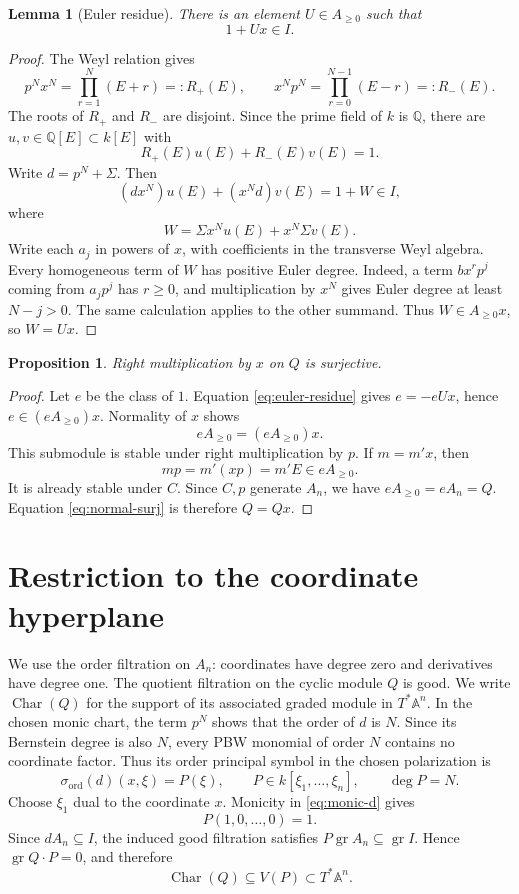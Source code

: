 \documentclass[11pt]{amsart}
\newtheorem{proposition}[theorem]{Proposition}
\newtheorem{lemma}[theorem]{Lemma}
\theoremstyle{definition}
\newcommand{\CharVar}{\operatorname{Char}}
\begin{document}
\begin{lemma}[Euler residue]\label{lem:euler-residue}
There is an element $U\in A_{\geq0}$ such that
\[
 1+Ux\in I.
 \tag{2.5}\label{eq:euler-residue}
\]
\end{lemma}

\begin{proof}
The Weyl relation gives
\[
 p^Nx^N=\prod_{r=1}^N(E+r)=:R_+(E),\qquad
 x^Np^N=\prod_{r=0}^{N-1}(E-r)=:R_-(E).
\]
The roots of $R_+$ and $R_-$ are disjoint. Since the prime field of $k$ is
$\mathbb Q$, there are $u,v\in\mathbb Q[E]\subset k[E]$ with
\[
 R_+(E)u(E)+R_-(E)v(E)=1.
\]
Write $d=p^N+\Sigma$. Then
\[
 (dx^N)u(E)+(x^Nd)v(E)=1+W\in I,
\]
where
\[
 W=\Sigma x^Nu(E)+x^N\Sigma v(E).
\]
Write each $a_j$ in powers of $x$, with coefficients in the transverse Weyl
algebra. Every homogeneous term of $W$ has positive Euler degree. Indeed, a term
$bx^rp^j$ coming from $a_jp^j$ has $r\geq0$, and multiplication by
$x^N$ gives Euler degree at least $N-j>0$. The same calculation applies to
the other summand. Thus $W\in A_{\geq0}x$, so $W=Ux$.
\end{proof}

\begin{proposition}\label{prop:x-surjective}
Right multiplication by $x$ on $Q$ is surjective.
\end{proposition}

\begin{proof}
Let $e$ be the class of $1$. Equation \eqref{eq:euler-residue} gives
$e=-eUx$, hence $e\in(eA_{\geq0})x$. Normality of $x$ shows
\[
 eA_{\geq0}=(eA_{\geq0})x.
 \tag{2.6}\label{eq:normal-surj}
\]
This submodule is stable under right multiplication by $p$. If $m=m'x$, then
\[
 mp=m'(xp)=m'E\in eA_{\geq0}.
\]
It is already stable under $C$. Since $C,p$ generate $A_n$, we have
$eA_{\geq0}=eA_n=Q$. Equation \eqref{eq:normal-surj} is therefore $Q=Qx$.
\end{proof}

\section{Restriction to the coordinate hyperplane}

We use the order filtration on $A_n$: coordinates have degree zero and
derivatives have degree one. The quotient filtration on the cyclic module
$Q$ is good. We write $\CharVar(Q)$ for the support of its associated graded
module in $T^*\mathbb A^n$. In the chosen monic chart, the term $p^N$ shows
that the order of $d$ is $N$. Since its Bernstein degree is also $N$, every
PBW monomial of order $N$ contains no coordinate factor. Thus its order
principal symbol in the chosen polarization is
\[
 \sigma_{\mathrm{ord}}(d)(x,\xi)=P(\xi),\qquad
 P\in k[\xi_1,\ldots,\xi_n],\qquad \deg P=N.
 \tag{3.1}\label{eq:P}
\]
Choose $\xi_1$ dual to the coordinate $x$. Monicity in \eqref{eq:monic-d}
gives
\[
 P(1,0,\ldots,0)=1.
 \tag{3.2}\label{eq:P-e1}
\]
Since $dA_n\subseteq I$, the induced good filtration satisfies
$P\operatorname{gr}A_n\subseteq\operatorname{gr}I$. Hence
$\operatorname{gr}Q\cdot P=0$, and therefore
\[
 \CharVar(Q)\subseteq V(P)\subset T^*\mathbb A^n.
 \tag{3.3}\label{eq:char-contained}
\]
\end{document}
